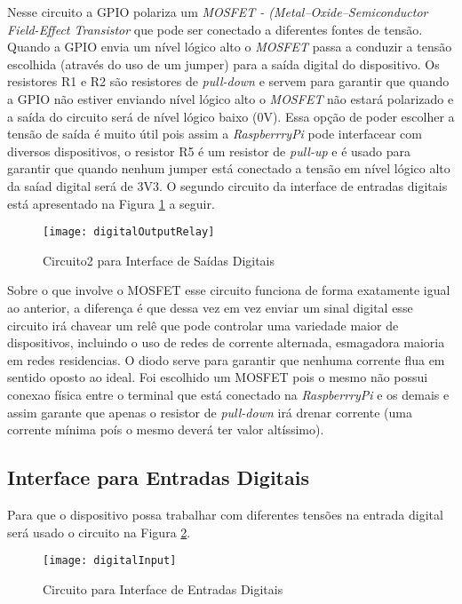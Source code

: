 	Nesse circuito a GPIO polariza um \textit{MOSFET - (Metal–Oxide–Semiconductor Field-Effect Transistor} que pode ser conectado a diferentes fontes de tensão. Quando a GPIO envia um nível lógico alto o \textit{MOSFET} passa a conduzir a tensão escolhida (através do uso de um jumper) para a saída digital do dispositivo. Os resistores R1 e R2 são resistores de \textit{pull-down} e servem para garantir que quando a GPIO não estiver enviando nível lógico alto o \textit{MOSFET} não estará polarizado e a saída do circuito será de nível lógico baixo (0V). Essa opção de poder escolher a tensão de saída é muito útil pois assim a \textit{RaspberrryPi} pode interfacear com diversos dispositivos, o resistor R5 é um resistor de \textit{pull-up} e é usado para garantir que quando nenhum jumper está conectado a tensão em nível lógico alto da saíad digital será de 3V3. O segundo circuito da interface de entradas digitais está apresentado na Figura \ref{fig-digitalOutputRelay} a seguir.
	
	\begin{figure}[htbp]
		\centering
			\texttt{[image: digitalOutputRelay]}
		\caption{Circuito2 para Interface de Saídas Digitais}
		\label{fig-digitalOutputRelay}
	\end{figure}
	
	Sobre o que involve o MOSFET esse circuito funciona de forma exatamente igual ao anterior, a diferença é que dessa vez em vez enviar um sinal digital esse circuito irá chavear um relê que pode controlar uma variedade maior de dispositivos, incluindo o uso de redes de corrente alternada, esmagadora maioria em redes residencias. O diodo serve para garantir que nenhuma corrente flua em sentido oposto ao ideal. Foi escolhido um MOSFET pois o mesmo não possui conexao física entre o terminal que está conectado na \textit{RaspberrryPi} e os demais e assim garante que apenas o resistor de \textit{pull-down} irá drenar corrente (uma corrente mínima poís o mesmo deverá ter valor altíssimo).

\subsection{Interface para Entradas Digitais}

Para que o dispositivo possa trabalhar com diferentes tensões na entrada digital será usado o circuito na Figura \ref{fig-digitalInput}.

	\begin{figure}[htbp]
		\centering
			\texttt{[image: digitalInput]}
		\caption{Circuito para Interface de Entradas Digitais}
		\label{fig-digitalInput}
	\end{figure}
	
